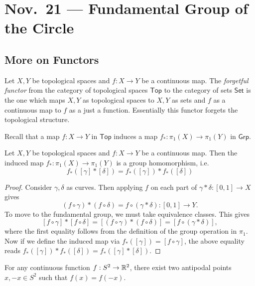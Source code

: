 \chapter{Nov.~21 --- Fundamental Group of the Circle}

\section{More on Functors}
\begin{example}
  Let $X, Y$ be topological spaces and
  $f : X \to Y$ be a continuous map.
  The \emph{forgetful functor} from the category
  of topological spaces $\mathsf{Top}$
  to the category of sets $\mathsf{Set}$
  is the one which maps $X, Y$ as topological
  spaces to $X, Y$ as sets and $f$ as a continuous map
  to $f$ as a just a function. Essentially
  this functor forgets the topological structure.
\end{example}

\begin{remark}
  Recall that a map $f : X \to Y$ in
  $\mathsf{Top}$ induces a map
  $f_* : \pi_1(X) \to \pi_1(Y)$ in $\mathsf{Grp}$.
\end{remark}

\begin{prop}
  Let $X, Y$ be topological spaces and
  $f : X \to Y$ be a continuous map. Then
  the induced map $f_* : \pi_1(X) \to \pi_1(Y)$
  is a group homomorphism, i.e.
  \[
    f_*([\gamma] * [\delta])
    = f_*([\gamma]) * f_*([\delta])
  \]
\end{prop}

\begin{proof}
  Consider $\gamma, \delta$ as curves.
  Then applying $f$ on each part of
  $\gamma * \delta : [0, 1] \to X$ gives
  \[
    (f \circ \gamma) * (f \circ \delta)
    = f \circ (\gamma * \delta)
    : [0, 1] \to Y.
  \]
  To move to the fundamental group, we must
  take equivalence classes. This gives
  \[
    [f \circ \gamma] * [f \circ \delta]
    = [(f \circ \gamma) * (f \circ \delta)]
    = [f \circ (\gamma * \delta)],
  \]
  where the first equality follows from the
  definition of the group operation in $\pi_1$.
  Now if we define the induced
  map via $f_*([\gamma]) = [f \circ \gamma]$,
  the above equality reads
  $f_*([\gamma]) * f_*([\delta]) = f_*([\gamma] * [\delta])$.
\end{proof}

\begin{theorem}
  For any continuous function $f : S^2 \to \mathbb{R}^2$,
  there exist two antipodal points
  $x, -x \in S^2$ such that $f(x) = f(-x)$.
\end{theorem}

